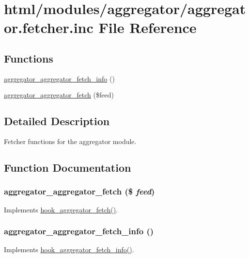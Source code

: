 \hypertarget{aggregator_8fetcher_8inc}{
\section{html/modules/aggregator/aggregator.fetcher.inc File Reference}
\label{aggregator_8fetcher_8inc}
}
\subsection*{Functions}
\begin{DoxyCompactItemize}
\item 
\hyperlink{aggregator_8fetcher_8inc_a000a6f4c9fc068002b1ad6bb77ae26c9}{aggregator\_\-aggregator\_\-fetch\_\-info} ()
\item 
\hyperlink{aggregator_8fetcher_8inc_a016aac8bdf5b52848acaa5c78f6bd1fc}{aggregator\_\-aggregator\_\-fetch} (\$feed)
\end{DoxyCompactItemize}


\subsection{Detailed Description}
Fetcher functions for the aggregator module. 

\subsection{Function Documentation}
\hypertarget{aggregator_8fetcher_8inc_a016aac8bdf5b52848acaa5c78f6bd1fc}{
\subsubsection[{aggregator\_\-aggregator\_\-fetch}]{\setlength{\rightskip}{0pt plus 5cm}aggregator\_\-aggregator\_\-fetch (\$ {\em feed})}}
\label{aggregator_8fetcher_8inc_a016aac8bdf5b52848acaa5c78f6bd1fc}
Implements \hyperlink{group__hooks_ga459db08cc062e9ea3bf1f526daf91a4a}{hook\_\-aggregator\_\-fetch()}. \hypertarget{aggregator_8fetcher_8inc_a000a6f4c9fc068002b1ad6bb77ae26c9}{
\subsubsection[{aggregator\_\-aggregator\_\-fetch\_\-info}]{\setlength{\rightskip}{0pt plus 5cm}aggregator\_\-aggregator\_\-fetch\_\-info ()}}
\label{aggregator_8fetcher_8inc_a000a6f4c9fc068002b1ad6bb77ae26c9}
Implements \hyperlink{group__hooks_gaa9eb0b672b7f66eb5aaccf27e8ff995f}{hook\_\-aggregator\_\-fetch\_\-info()}. 